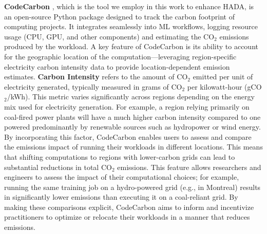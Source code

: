 \documentclass[a4paper,singleside,12pt]{report} %
\begin{document}
\textbf{CodeCarbon} \cite{courty2024codecarbon}, which is the tool we employ in this work to enhance HADA, is an open-source 
Python package designed to track the carbon footprint of computing projects. It integrates seamlessly into ML workflows, 
logging resource usage (CPU, GPU, and other components) and estimating the $\mathrm{CO_2}$ emissions produced by the workload. 
A key feature of CodeCarbon is its ability to account for the geographic location of the computation—leveraging region-specific 
electricity carbon intensity data to provide location-dependent emission estimates. \textbf{Carbon Intensity} refers to the 
amount of $\mathrm{CO_2}$ emitted per unit of electricity generated, typically measured in grams of $\mathrm{CO_2}$ per 
kilowatt-hour (gCO$_2$/kWh). This metric varies significantly across regions depending on the energy mix used for electricity 
generation. For example, a region relying primarily on coal-fired power plants will have a much higher carbon intensity compared 
to one powered predominantly by renewable sources such as hydropower or wind energy. By incorporating this factor, CodeCarbon 
enables users to assess and compare the emissions impact of running their workloads in different locations. This means that 
shifting computations to regions with lower-carbon grids can lead to substantial reductions in total $\mathrm{CO_2}$ emissions.
This feature allows researchers and engineers to assess the impact of their computational choices; for example, running the same 
training job on a hydro-powered grid (e.g., in Montreal) results in significantly lower emissions than executing it on a 
coal-reliant grid. By making these comparisons explicit, CodeCarbon aims to inform and incentivize practitioners to optimize or 
relocate their workloads in a manner that reduces emissions.
\end{document}
